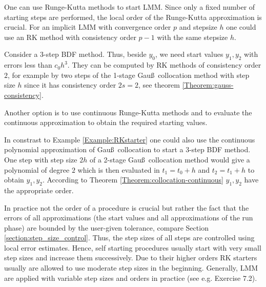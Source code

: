 \begin{example}
\label{Example:RKstarter}
One can use Runge-Kutta methods to start LMM. Since only a fixed
number of starting steps are performed, the local order of the
Runge-Kutta approximation is crucial.  For an implicit LMM with
convergence order $p$ and stepsize $h$ one could use an RK method with
consistency order $p-1$ with the same stepsize $h$.

Consider a 3-step BDF method. Thus, beside $y_0$, we need start values 
$y_1, y_2$ with errors less than $c_0 h^3$. They can be computed by RK methods 
of consistency order $2$, for example by two steps of the 1-stage Gau\ss \ 
collocation method with step size $h$ since it has consistency order $2s=2$, 
see theorem \ref{Theorem:gauss-consistency}.
\end{example}




\begin{example}
  Another option is to use continuous Runge-Kutta methods and to
  evaluate the continuous approximation to obtain the required
  starting values.

  In constrast to Example \ref{Example:RKstarter} one could also use
  the continuous polynomial approximation of Gau\ss \ collocation to
  start a 3-step BDF method. One step with step size $2h$ of a 2-stage
  Gau\ss \ collocation method would give a polynomial of degree $2$
  which is then evaluated in $t_1=t_0+h$ and $t_2=t_1+h$ to obtain
  $y_1, y_2$. According to Theorem
  \ref{Theorem:collocation-continuous} $y_1, y_2$ have the appropriate
  order.
\end{example}

\begin{remark}
  In practice not the order of a procedure is crucial but rather the
  fact that the errors of all approximations (the start values and all
  approximations of the run phase) are bounded by the user-given
  tolerance, compare Section \ref{section:step_size_control}. Thus,
  the step sizes of all steps are controlled using local error
  estimates. Hence, self starting procedures usually start with very
  small step sizes and increase them successively. Due to their higher
  orders RK starters usually are allowed to use moderate step sizes in
  the beginning. Generally, LMM are applied with variable step sizes
  and orders in practice (see e.g. Exercise 7.2).
\end{remark}



